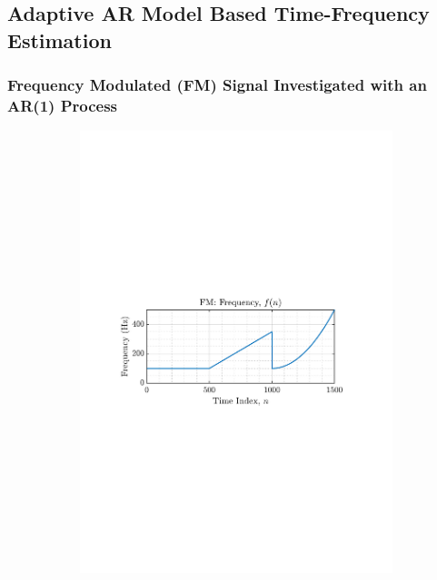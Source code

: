 \documentclass[12pt]{article}
\numberwithin{equation}{section}
\begin{document}
	\subsection{Adaptive AR Model Based Time-Frequency Estimation} \label{sec: 3-2-adaptive-ar-spectrum-estimate}
		\subsubsection{Frequency Modulated (FM) Signal Investigated with an AR(1) Process}
			\begin{figure}[H]
				\centering
				\begin{subfigure}{0.49\textwidth}
					\centering
					\includegraphics[trim={2.2cm 11.2cm 3.00cm  11.2cm}, clip, width=\textwidth]{../MATLAB/figures/q3_2a_fig01.pdf} 
					\captionsetup{justification=centering}
				\end{subfigure}

\end{figure}
\end{document}
